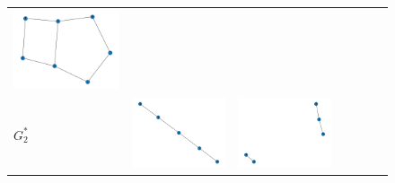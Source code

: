 \documentclass[11pt,a4paper,openright,oneside]{book}
\numberwithin{equation}{section}
\begin{document}
{\begin{figure}[H]
\begin{adjustwidth}{-3cm}{-3cm}
\begin{tabular}{>{\centering\arraybackslash}m{1.5cm}| m{2.5cm} |m{2.5cm} |m{2.5cm} |m{2.5cm} |m{2.5cm} |m{2.5cm}}
        \includegraphics[width=\linewidth]{media/nn/graph-2-tnale-2-RR1.png} \\
        $G_2^*$ &
        \includegraphics[width=\linewidth]{media/nn/graph-0.1-tnale-0.1-RR2.png} &
        \includegraphics[width=\linewidth]{media/nn/graph-0.25-tnale-0.25-RR2.png} &

\end{tabular}
\end{adjustwidth}
\end{figure}}
\end{document}

